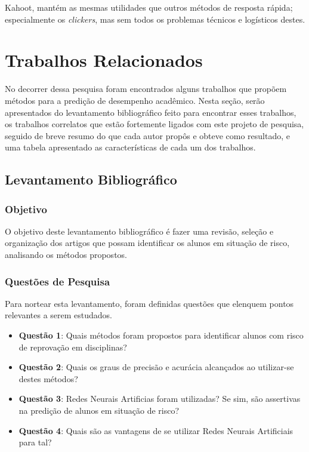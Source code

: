 \documentclass[
	12pt,				%
	openright,			%
	oneside,
	a4paper,			%
	english,			%
	french,				%
	spanish,			%
	brazil,				%
	]{abntex2}
\begin{document}

Kahoot, mantém as mesmas utilidades que outros métodos de resposta rápida; especialmente os \textit{clickers}, mas sem todos os problemas técnicos e logísticos destes. \cite{pintor2014kahoot}

\chapter{Trabalhos Relacionados}
\label{sec:TR}
No decorrer dessa pesquisa foram encontrados alguns trabalhos que propõem métodos para a predição de desempenho acadêmico. Nesta seção, serão apresentados do levantamento bibliográfico feito para encontrar esses trabalhos, os trabalhos correlatos que estão fortemente ligados com este projeto de pesquisa, seguido de breve resumo do que cada autor propôs e obteve como resultado, e uma tabela apresentado as  características de cada um dos trabalhos.

\section{Levantamento Bibliográfico}
\label{sec:Lev}
\subsection{Objetivo}
\label{sec:Obj}
O objetivo deste levantamento bibliográfico é fazer uma revisão, seleção e organização dos artigos que possam identificar os alunos em situação de risco, analisando os métodos propostos.

\subsection{Questões de Pesquisa}
\label{sec:QP}
Para nortear esta levantamento, foram definidas questões que elenquem pontos relevantes a serem estudados.
\begin{itemize}
    \item \textbf{Questão 1}: Quais métodos foram propostos para identificar alunos com risco de reprovação em disciplinas?
    \item \textbf{Questão 2}: Quais os graus de precisão e acurácia alcançados ao utilizar-se destes métodos?
    \item \textbf{Questão 3}: Redes Neurais Artificias foram utilizadas? Se sim, são assertivas na predição de alunos em situação de risco?
    \item \textbf{Questão 4}: Quais são as vantagens de se utilizar Redes Neurais Artificiais para tal?
\end{itemize}
\end{document}
